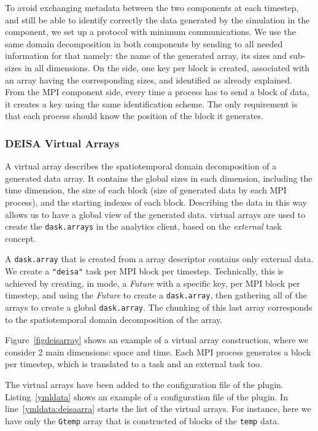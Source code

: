 To avoid exchanging metadata between the two components at each timestep, and still be able to identify correctly the data generated by the simulation in the \dask component, we set up a protocol with minimum communications. We use the same domain decomposition in both components by sending to \dask all needed information for that namely: the name of the generated array, its sizes and sub-sizes in all dimensions. On the \dask side, one key per block is created, associated with an array having the corresponding sizes, and identified as already explained. From the MPI component side, every time a process has to send a block of data, it creates a key using the same identification scheme. The only requirement is that each process should know the position of the block it generates.


\subsubsection{DEISA Virtual Arrays}\label{sec:deisavirtualarr}

A \deisa virtual array describes the spatiotemporal domain decomposition of a generated data array. It contains the global sizes in each dimension, including the time dimension, the size of each block (size of generated data by each MPI process), and the starting indexes of each block. Describing the data in this way allows us to have a global view of the generated data. \deisa virtual arrays are used to create the \texttt{dask.arrays} in the analytics client, based on the \textit{external} task concept.

A \texttt{dask.array} that is created from a \deisa array descriptor contains only external data. We create a \texttt{"deisa"} task per MPI block per timestep. Technically, this is achieved by creating, in \deisa mode, a \textit{Future} with a specific key, per MPI block per timestep, and using the \textit{Future} to create a \texttt{dask.array}, then gathering all of the arrays to create a global \texttt{dask.array}. The chunking of this last array corresponds to the spatiotemporal domain decomposition of the \deisa array. 

Figure~\ref{figdeisarray} shows an example of a \deisa virtual array construction, where we consider 2 main dimensions: space and time. Each MPI process generates a block per timestep, which is translated to a \deisa task and an external task too. 

The \deisa virtual arrays have been added to the configuration file of the \deisa plugin. Listing~\ref{ymldata} shows an example of a configuration file of the \deisa plugin. In line~\ref{ymldata:deisaarra} starts the list of the \deisa virtual arrays. For instance, here we have only the \texttt{Gtemp} array that is constructed of blocks of the \texttt{temp} data.

